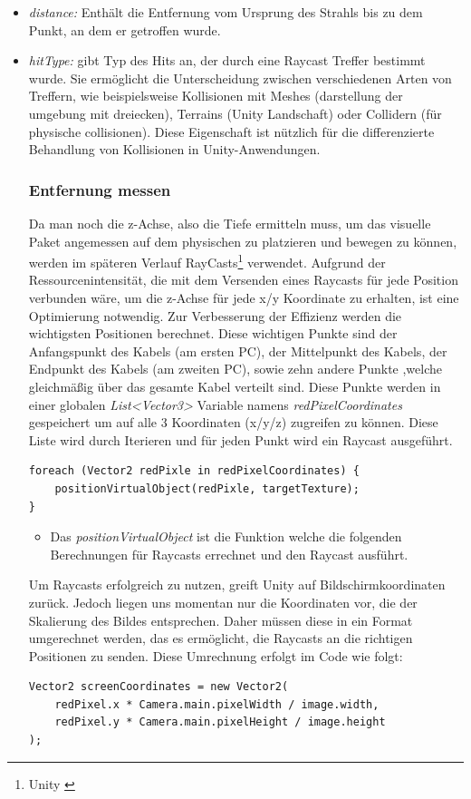 \begin{itemize}
    \item \textit{distance: } Enthält die Entfernung vom Ursprung des Strahls bis zu dem Punkt, an dem er getroffen wurde.
    \item \textit{hitType: } gibt Typ des Hits an, der durch eine Raycast Treffer bestimmt wurde. Sie ermöglicht die Unterscheidung zwischen verschiedenen Arten von Treffern, wie beispielsweise Kollisionen mit Meshes (darstellung der umgebung mit dreiecken), Terrains (Unity Landschaft) oder Collidern (für physische collisionen). Diese Eigenschaft ist nützlich für die differenzierte Behandlung von Kollisionen in Unity-Anwendungen.
    \subsubsection{Entfernung messen}
    Da man noch die z-Achse, also die Tiefe ermitteln muss, um das visuelle Paket angemessen auf dem physischen zu platzieren und bewegen zu können, werden
    im späteren Verlauf RayCasts\protect\footnote{Unity \cite{Raycast}} verwendet. Aufgrund der Ressourcenintensität, die mit dem Versenden eines Raycasts
    für jede Position verbunden wäre, um die z-Achse für jede x/y Koordinate zu erhalten, ist eine Optimierung notwendig.
    Zur Verbesserung der Effizienz werden die wichtigsten Positionen berechnet. Diese wichtigen Punkte sind der
    Anfangspunkt des Kabels (am ersten PC), der Mittelpunkt des Kabels, der Endpunkt des Kabels (am zweiten PC), sowie zehn andere Punkte ,welche gleichmäßig über das gesamte Kabel verteilt sind. Diese Punkte werden in einer globalen \textit{List<Vector3>} Variable namens \textit{redPixelCoordinates} gespeichert um auf alle 3 Koordinaten (x/y/z) zugreifen zu können. Diese Liste wird durch Iterieren und für jeden Punkt wird ein Raycast ausgeführt.
    \begin{lstlisting}[style=csharp, caption={Iteration durch die Liste der Raycastpunkte}, label=code:]
foreach (Vector2 redPixle in redPixelCoordinates) {
    positionVirtualObject(redPixle, targetTexture);
}
    \end{lstlisting}
    \begin{itemize}
        \item Das \textit{positionVirtualObject} ist die Funktion welche die folgenden Berechnungen für Raycasts errechnet und den Raycast ausführt. \\
    \end{itemize}
    Um Raycasts erfolgreich zu nutzen, greift Unity auf Bildschirmkoordinaten zurück. Jedoch liegen uns momentan nur die Koordinaten vor, die der Skalierung des Bildes entsprechen. Daher müssen diese in ein Format umgerechnet werden, das es ermöglicht, die Raycasts an die richtigen Positionen zu senden. Diese Umrechnung erfolgt im Code wie folgt:
    \begin{lstlisting}[style=csharp, caption={Koordinaten Umrechnung}, label=code:Coordinates calculations]
Vector2 screenCoordinates = new Vector2(
    redPixel.x * Camera.main.pixelWidth / image.width,
    redPixel.y * Camera.main.pixelHeight / image.height
);
    \end{lstlisting}


\end{itemize}

